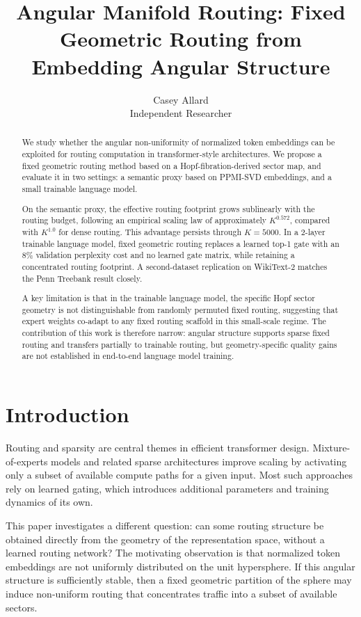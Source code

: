 \documentclass[10pt,twocolumn]{article}
\title{Angular Manifold Routing: Fixed Geometric Routing from Embedding Angular Structure}
\author{
Casey Allard\\
Independent Researcher
}
\date{}
\begin{document}
\maketitle

\begin{abstract}
We study whether the angular non-uniformity of normalized token embeddings can be exploited for routing computation in transformer-style architectures. We propose a fixed geometric routing method based on a Hopf-fibration-derived sector map, and evaluate it in two settings: a semantic proxy based on PPMI-SVD embeddings, and a small trainable language model.

On the semantic proxy, the effective routing footprint grows sublinearly with the routing budget, following an empirical scaling law of approximately $K^{0.572}$, compared with $K^{1.0}$ for dense routing. This advantage persists through $K=5000$. In a 2-layer trainable language model, fixed geometric routing replaces a learned top-1 gate with an 8\% validation perplexity cost and no learned gate matrix, while retaining a concentrated routing footprint. A second-dataset replication on WikiText-2 matches the Penn Treebank result closely.

A key limitation is that in the trainable language model, the specific Hopf sector geometry is not distinguishable from randomly permuted fixed routing, suggesting that expert weights co-adapt to any fixed routing scaffold in this small-scale regime. The contribution of this work is therefore narrow: angular structure supports sparse fixed routing and transfers partially to trainable routing, but geometry-specific quality gains are not established in end-to-end language model training.
\end{abstract}

\section{Introduction}
Routing and sparsity are central themes in efficient transformer design. Mixture-of-experts models and related sparse architectures improve scaling by activating only a subset of available compute paths for a given input. Most such approaches rely on learned gating, which introduces additional parameters and training dynamics of its own.

This paper investigates a different question: can some routing structure be obtained directly from the geometry of the representation space, without a learned routing network? The motivating observation is that normalized token embeddings are not uniformly distributed on the unit hypersphere. If this angular structure is sufficiently stable, then a fixed geometric partition of the sphere may induce non-uniform routing that concentrates traffic into a subset of available sectors.
\end{document}
